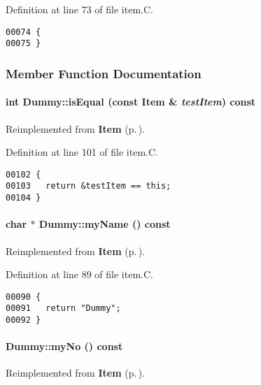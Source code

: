 Definition at line 73 of file item.C.\small\begin{verbatim}00074 {
00075 }
\end{verbatim}\normalsize 


\subsubsection{Member Function Documentation}
\label{Dummy_a4}
\paragraph{\setlength{\rightskip}{0pt plus 5cm}int Dummy::is\-Equal (const {\bf Item} \& {\em test\-Item}) const\hspace{0.3cm}{\tt  [virtual]}}\hfill



Reimplemented from {\bf Item} {\rm (p.\,\pageref{Item_a5})}.

Definition at line 101 of file item.C.\small\begin{verbatim}00102 {
00103   return &testItem == this;
00104 }
\end{verbatim}\normalsize 
\label{Dummy_a3}
\paragraph{\setlength{\rightskip}{0pt plus 5cm}char $\ast$ Dummy::my\-Name () const\hspace{0.3cm}{\tt  [virtual]}}\hfill



Reimplemented from {\bf Item} {\rm (p.\,\pageref{Item_a4})}.

Definition at line 89 of file item.C.\small\begin{verbatim}00090 {
00091   return "Dummy";
00092 }
\end{verbatim}\normalsize 
\label{Dummy_a2}
\paragraph{ Dummy::my\-No () const\hspace{0.3cm}{\tt  [virtual]}}\hfill



Reimplemented from {\bf Item} {\rm (p.\,\pageref{Item_a3})}.

